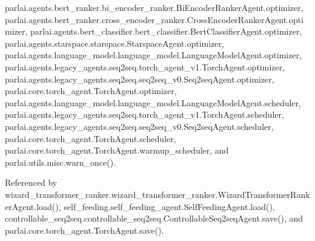 parlai.\+agents.\+bert\+\_\+ranker.\+bi\+\_\+encoder\+\_\+ranker.\+Bi\+Encoder\+Ranker\+Agent.\+optimizer, parlai.\+agents.\+bert\+\_\+ranker.\+cross\+\_\+encoder\+\_\+ranker.\+Cross\+Encoder\+Ranker\+Agent.\+optimizer, parlai.\+agents.\+bert\+\_\+classifier.\+bert\+\_\+classifier.\+Bert\+Classifier\+Agent.\+optimizer, parlai.\+agents.\+starspace.\+starspace.\+Starspace\+Agent.\+optimizer, parlai.\+agents.\+language\+\_\+model.\+language\+\_\+model.\+Language\+Model\+Agent.\+optimizer, parlai.\+agents.\+legacy\+\_\+agents.\+seq2seq.\+torch\+\_\+agent\+\_\+v1.\+Torch\+Agent.\+optimizer, parlai.\+agents.\+legacy\+\_\+agents.\+seq2seq.\+seq2seq\+\_\+v0.\+Seq2seq\+Agent.\+optimizer, parlai.\+core.\+torch\+\_\+agent.\+Torch\+Agent.\+optimizer, parlai.\+agents.\+language\+\_\+model.\+language\+\_\+model.\+Language\+Model\+Agent.\+scheduler, parlai.\+agents.\+legacy\+\_\+agents.\+seq2seq.\+torch\+\_\+agent\+\_\+v1.\+Torch\+Agent.\+scheduler, parlai.\+agents.\+legacy\+\_\+agents.\+seq2seq.\+seq2seq\+\_\+v0.\+Seq2seq\+Agent.\+scheduler, parlai.\+core.\+torch\+\_\+agent.\+Torch\+Agent.\+scheduler, parlai.\+core.\+torch\+\_\+agent.\+Torch\+Agent.\+warmup\+\_\+scheduler, and parlai.\+utils.\+misc.\+warn\+\_\+once().



Referenced by wizard\+\_\+transformer\+\_\+ranker.\+wizard\+\_\+transformer\+\_\+ranker.\+Wizard\+Transformer\+Ranker\+Agent.\+load(), self\+\_\+feeding.\+self\+\_\+feeding\+\_\+agent.\+Self\+Feeding\+Agent.\+load(), controllable\+\_\+seq2seq.\+controllable\+\_\+seq2seq.\+Controllable\+Seq2seq\+Agent.\+save(), and parlai.\+core.\+torch\+\_\+agent.\+Torch\+Agent.\+save().

